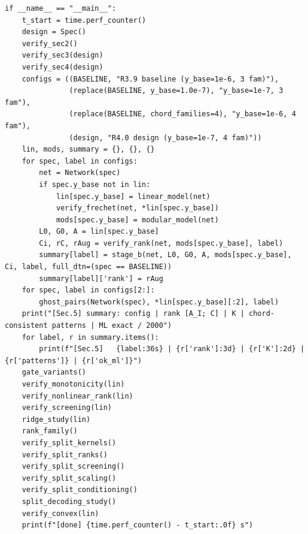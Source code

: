 \documentclass[11pt,a4paper]{article}
\theoremstyle{definition}
\theoremstyle{remark}
\begin{document}
\begin{lstlisting}
if __name__ == "__main__":
    t_start = time.perf_counter()
    design = Spec()
    verify_sec2()
    verify_sec3(design)
    verify_sec4(design)
    configs = ((BASELINE, "R3.9 baseline (y_base=1e-6, 3 fam)"),
               (replace(BASELINE, y_base=1.0e-7), "y_base=1e-7, 3 fam"),
               (replace(BASELINE, chord_families=4), "y_base=1e-6, 4 fam"),
               (design, "R4.0 design (y_base=1e-7, 4 fam)"))
    lin, mods, summary = {}, {}, {}
    for spec, label in configs:
        net = Network(spec)
        if spec.y_base not in lin:
            lin[spec.y_base] = linear_model(net)
            verify_frechet(net, *lin[spec.y_base])
            mods[spec.y_base] = modular_model(net)
        L0, G0, A = lin[spec.y_base]
        Ci, rC, rAug = verify_rank(net, mods[spec.y_base], label)
        summary[label] = stage_b(net, L0, G0, A, mods[spec.y_base], Ci, label, full_dtn=(spec == BASELINE))
        summary[label]['rank'] = rAug
    for spec, label in configs[2:]:
        ghost_pairs(Network(spec), *lin[spec.y_base][:2], label)
    print("[Sec.5] summary: config | rank [A_I; C] | K | chord-consistent patterns | ML exact / 2000")
    for label, r in summary.items():
        print(f"[Sec.5]   {label:36s} | {r['rank']:3d} | {r['K']:2d} | {r['patterns']} | {r['ok_ml']}")
    gate_variants()
    verify_monotonicity(lin)
    verify_nonlinear_rank(lin)
    verify_screening(lin)
    ridge_study(lin)
    rank_family()
    verify_split_kernels()
    verify_split_ranks()
    verify_split_screening()
    verify_split_scaling()
    verify_split_conditioning()
    split_decoding_study()
    verify_convex(lin)
    print(f"[done] {time.perf_counter() - t_start:.0f} s")
\end{lstlisting}
\end{document}
